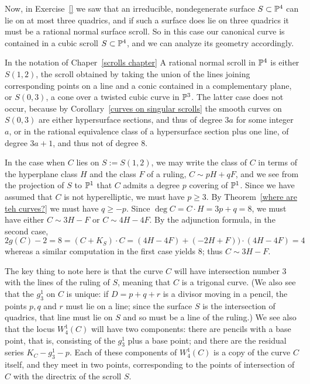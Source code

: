 Now, in Exercise~\ref{} we saw 
 that an irreducible, nondegenerate surface $S \subset \PP^4$ can lie on at most three quadrics, and if such a surface does lie on three quadrics it must be a rational normal surface scroll. So in this case our canonical curve is contained in a cubic scroll $S \subset \PP^4$, and we can analyze its geometry accordingly.

In the notation of Chaper~\ref{scrolls chapter} A rational normal scroll in $\PP^4$ is either
$S(1,2)$, the scroll obtained by taking the union of the lines joining corresponding points on a line and a conic contained in a complementary plane, or $S(0,3)$, a cone over a twisted cubic curve in $\PP^3$. The latter case does not occur, because by Corollary~\ref{curves on singular scrolls} the smooth curves on $S(0,3)$ are either hypersurface sections, and thus of degree $3a$ for
some integer $a$, or in the rational equivalence class of a hypersurface section plus one line,
of degree $3a+1$, and thus not of degree 8.

In the case when $C$ lies on $S := S(1,2)$, we may write the class of $C$ in terms of the hyperplane class $H$ and the class $F$ of a ruling, $C\sim pH+qF$, and we see from the 
projection of $S$ to $\PP^1$ that $C$ admits
a degree $p$ covering of $\PP^1$. Since we have assumed that $C$ is not hyperelliptic,
we must have $p\geq 3$. By Theorem~\ref{where are teh curves?} we must have
$q\geq -p$. Since $\deg C = C\cdot H = 3p+q = 8$, we must have either 
$C\sim 3H-F$ or $C\sim 4H-4F$. By the adjunction formula, in the second case,
$$
2g(C)-2 = 8 = (C+K_S)\cdot C = (4H-4F)+(-2H+F))\cdot(4H-4F) =4
$$
whereas a similar computation in the first case yields 8; thus $C\sim 3H-F$.

The key thing to note here is that the curve $C$ will have intersection number 3 with the lines of the ruling of $S$, meaning that $C$ is a trigonal curve. (We also see that the $g^1_3$ on $C$ is unique: if $D = p + q + r$ is a divisor moving in a pencil, the points $p, q$ and $r$ must lie on a line; since the surface $S$ is the intersection of quadrics, that line must lie on $S$ and so must be a line of the ruling.) We see also that the locus $W^1_4(C)$ will have two components: there are pencils with a base point, that is, consisting of the $g^1_3$ plus a base point; and there are the residual series $K_C - g^1_3 - p$. Each of these components of $W^1_4(C)$ is a copy of the curve $C$ itself, and they meet in two points, corresponding to the points of intersection of $C$ with the directrix of the scroll $S$.

